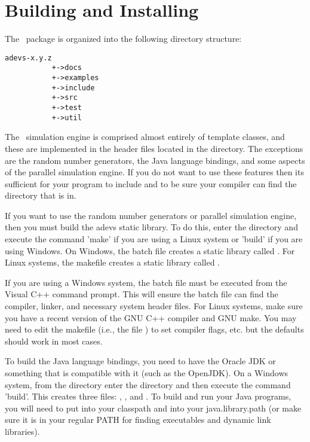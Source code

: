 \chapter{Building and Installing}
The \adevs\ package is organized into the following directory structure:
\begin{verbatim}
adevs-x.y.z
           +->docs
           +->examples
           +->include
           +->src
           +->test
           +->util
\end{verbatim}
The \adevs\ simulation engine is comprised almost entirely of template classes, and these are implemented in the header files located in the  directory. The exceptions are the random number generators, the Java language bindings, and some aspects of the parallel simulation engine. If you do not want to use these features then its sufficient for your program to include  and to be sure your compiler can find the  directory that  is in. 

If you want to use the random number generators or parallel simulation engine, then you must build the adevs static library. To do this, enter the  directory and execute the command 'make' if you are using a Linux system or 'build' if you are using Windows. On Windows, the batch file creates a static library called . For Linux systems, the makefile creates a static library called .

If you are using a Windows system, the batch file must be executed from the Visual C++ command prompt. This will ensure the batch file can find the compiler, linker, and necessary system header files. For Linux systems, make sure you have a recent version of the GNU C++ compiler and GNU make. You may need to edit the makefile (i.e., the file ) to set compiler flags, etc. but the defaults should work in most cases.

To build the Java language bindings, you need to have the Oracle JDK or something that is compatible with it (such as the OpenJDK). On a Windows system, from the  directory enter the  directory and then execute the command 'build'. This creates three files: , , and . To build and run your Java programs, you will need to put  into your classpath and  into your java.library.path (or make sure it is in your regular PATH for finding executables and dynamic link libraries).

